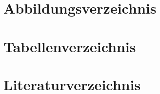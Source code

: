 \documentclass[12pt,a4paper,ngerman,captions=tableheading]{scrartcl}
\begin{document}
%




\newpage
\section{Abbildungsverzeichnis}



\section{Tabellenverzeichnis}



\section{Literaturverzeichnis}






%
%


\newpage
\end{document}
